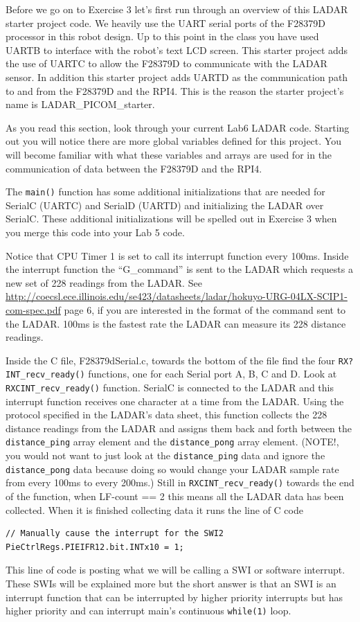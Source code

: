 \documentclass[11pt]{article}
\begin{document}
Before we go on to Exercise 3 let’s first run through an overview of this LADAR starter project code. We heavily use the UART serial ports of the F28379D processor in this robot design. Up to this point in the class you have used UARTB to interface with the robot’s text LCD screen. This starter project adds the use of UARTC to allow the F28379D to communicate with the LADAR sensor. In addition this starter project adds UARTD as the communication path to and from the F28379D and the RPI4. This is the reason the starter project’s name is LADAR\_PICOM\_starter.

As you read this section, look through your current Lab6 LADAR code. Starting out you will notice there are more global variables defined for this project. You will become familiar with what these variables and arrays are used for in the communication of data between the F28379D and the RPI4.

The \texttt{main()} function has some additional initializations that are needed for SerialC (UARTC) and SerialD (UARTD) and initializing the LADAR over SerialC. These additional initializations will be spelled out in Exercise 3 when you merge this code into your Lab 5 code.

Notice that CPU Timer 1 is set to call its interrupt function every 100ms. Inside the interrupt function the “G\_command” is sent to the LADAR which requests a new set of 228 readings from the LADAR. See \url{http://coecsl.ece.illinois.edu/se423/datasheets/ladar/hokuyo-URG-04LX-SCIP1-com-spec.pdf} page 6, if you are interested in the format of the command sent to the LADAR. 100ms is the fastest rate the LADAR can measure its 228 distance readings.

Inside the C file, F28379dSerial.c, towards the bottom of the file find the four \texttt{RX?INT\_recv\_ready()} functions, one for each Serial port A, B, C and D. Look at \texttt{RXCINT_recv_ready()} function. SerialC is connected to the LADAR and this interrupt function receives one character at a time from the LADAR. Using the protocol specified in the LADAR’s data sheet, this function collects the 228 distance readings from the LADAR and assigns them back and forth between the \texttt{distance_ping} array element and the \texttt{distance_pong} array element. (NOTE!, you would not want to just look at the \texttt{distance_ping} data and ignore the \texttt{distance_pong} data because doing so would change your LADAR sample rate from every 100ms to every 200ms.) Still in \texttt{RXCINT_recv_ready()} towards the end of the function, when LF-count == 2 this means all the LADAR data has been collected. When it is finished collecting data it runs the line of C code
%
\begin{verbatim}
// Manually cause the interrupt for the SWI2
PieCtrlRegs.PIEIFR12.bit.INTx10 = 1;
\end{verbatim}
%
This line of code is posting what we will be calling a SWI or software interrupt. These SWIs will be explained more but the short answer is that an SWI is an interrupt function that can be interrupted by higher priority interrupts but has higher priority and can interrupt main’s continuous \texttt{while(1)} loop.
\end{document}
